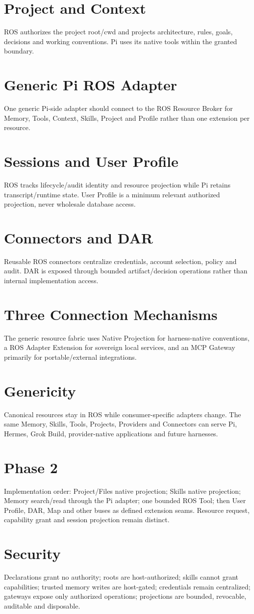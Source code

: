 \documentclass{article}
\begin{document}
\section{Project and Context}
ROS authorizes the project root/cwd and projects architecture, rules, goals, decisions and working conventions. Pi uses its native tools within the granted boundary.
\section{Generic Pi ROS Adapter}
One generic Pi-side adapter should connect to the ROS Resource Broker for Memory, Tools, Context, Skills, Project and Profile rather than one extension per resource.
\section{Sessions and User Profile}
ROS tracks lifecycle/audit identity and resource projection while Pi retains transcript/runtime state. User Profile is a minimum relevant authorized projection, never wholesale database access.
\section{Connectors and DAR}
Reusable ROS connectors centralize credentials, account selection, policy and audit. DAR is exposed through bounded artifact/decision operations rather than internal implementation access.
\section{Three Connection Mechanisms}
The generic resource fabric uses Native Projection for harness-native conventions, a ROS Adapter Extension for sovereign local services, and an MCP Gateway primarily for portable/external integrations.
\section{Genericity}
Canonical resources stay in ROS while consumer-specific adapters change. The same Memory, Skills, Tools, Projects, Providers and Connectors can serve Pi, Hermes, Grok Build, provider-native applications and future harnesses.
\section{Phase 2}
Implementation order: Project/Files native projection; Skills native projection; Memory search/read through the Pi adapter; one bounded ROS Tool; then User Profile, DAR, Map and other buses as defined extension seams. Resource request, capability grant and session projection remain distinct.
\section{Security}
Declarations grant no authority; roots are host-authorized; skills cannot grant capabilities; trusted memory writes are host-gated; credentials remain centralized; gateways expose only authorized operations; projections are bounded, revocable, auditable and disposable.
\end{document}
